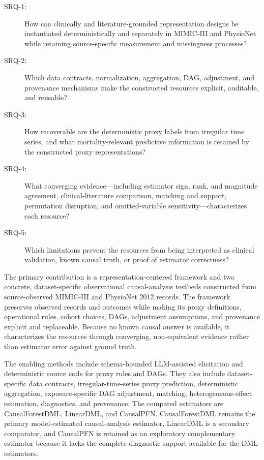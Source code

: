 \begin{description}
  \item[SRQ-1:] How can clinically and literature-grounded representation designs be instantiated deterministically and separately in MIMIC-III and PhysioNet while retaining source-specific measurement and missingness processes?
  \item[SRQ-2:] Which data contracts, normalization, aggregation, DAG, adjustment, and provenance mechanisms make the constructed resources explicit, auditable, and reusable?
  \item[SRQ-3:] How recoverable are the deterministic proxy labels from irregular time series, and what mortality-relevant predictive information is retained by the constructed proxy representations?
  \item[SRQ-4:] What converging evidence---including estimator sign, rank, and magnitude agreement, clinical-literature comparison, matching and support, permutation disruption, and omitted-variable sensitivity---characterizes each resource?
  \item[SRQ-5:] Which limitations prevent the resources from being interpreted as clinical validation, known causal truth, or proof of estimator correctness?
\end{description}

The primary contribution is a representation-centered framework and two concrete, dataset-specific observational causal-analysis testbeds constructed from source-observed MIMIC-III and PhysioNet 2012 records.  The framework preserves observed records and outcomes while making its proxy definitions, operational rules, cohort choices, DAGs, adjustment assumptions, and provenance explicit and replaceable.  Because no known causal answer is available, it characterizes the resources through converging, non-equivalent evidence rather than estimator error against ground truth.

The enabling methods include schema-bounded LLM-assisted elicitation and deterministic source code for proxy rules and DAGs.  They also include dataset-specific data contracts, irregular-time-series proxy prediction, deterministic aggregation, exposure-specific DAG adjustment, matching, heterogeneous-effect estimation, diagnostics, and provenance.  The compared estimators are CausalForestDML, LinearDML, and CausalPFN.  CausalForestDML remains the primary model-estimated causal-analysis estimator, LinearDML is a secondary comparator, and CausalPFN is retained as an exploratory complementary estimator because it lacks the complete diagnostic support available for the DML estimators.

